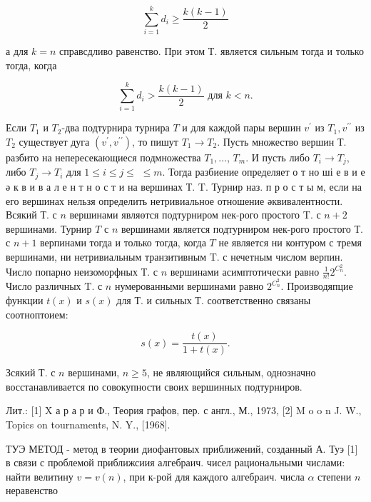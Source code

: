 \documentclass[10pt]{article}
\begin{document}
\[

\sum_{i=1}^{k} d_{i} \geqslant \frac{k(k-1)}{2}

\]



а для $k=n$ справсдливо равенство. При этом Т. является сильным тогда и только тогда, когда



\[

\sum_{i=1}^{k} d_{i}>\frac{k(k-1)}{2} \text { для } k<n .

\]



Если $T_{1}$ и $T_{2}$-два подтурнира турнира $T$ и для каждой пары вершин $v^{\prime}$ из $T_{1}, v^{\prime \prime}$ из $T_{2}$ существует дуга $\left(v^{\prime}, v^{\prime \prime}\right)$, то пишут $T_{1} \rightarrow T_{2}$. Пусть множество вершин Т. разбито на непересекающиеся подмножества $T_{1}, \ldots$, $T_{m}$. И пусть либо $T_{i} \rightarrow T_{j}$, либо $T_{j} \rightarrow T_{i}$ для $1 \leqslant i \leqslant j \leqslant$ $\leqslant m$. Тогда разбиение определяет о т но ші е в и е ә к в и в а л е н т н о с т и на вершинах Т. T. Турнир наз. п р о с т ы м, если на его вершинах нельзя определить нетривиальное отношение әквивалентности. Всякий Т. с $n$ вершинами являөтся подтурниром нек-рого простого T. с $n+2$ вершинами. Турнир $T$ с $n$ вершинами является подтурниром нек-рого простого Т. с $n+1$ верпинами тогда и только тогда, когда $T$ не является ни контуром с тремя вершинами, ни нетривиальным транзитивным T. с нечетным числом верпин. Число попарно неизоморфных Т. с $n$ вершинами асимптотически равно $\frac{1}{n !} 2^{C_{n}^{2}}$. Число различных $\mathrm{T}$. с $n$ нумерованными вершинами равно $2^{C_{n}^{2}}$. Производяпцие функции $t(x)$ и $s(x)$ для Т. и сильных Т. соответственно связаны соотноптоием:



\[

s(x)=\frac{t(x)}{1+t(x)} .

\]



Зсякий Т. с $n$ вершинами, $n \geqslant 5$, не являющийся сильным, однозначно восстанавливается по совокупности своих вершинных подтурниров.



Лит.: [1] X а р а р и Ф., Теория графов, пер. с англ., М., 1973, [2] M o o n J. W., Topics on tournaments, N. Y., [1968].



ТУЭ МЕТОД - метод в теории диофантовых приближений, созданный А. Туэ [1] в связи с проблемой приближсиия алгебраич. чисел рациональными числами: найти велитину $v=v(n)$, при к-рой для каждого алгебраич. числа $\alpha$ степени $n$ неравенство
\end{document}
